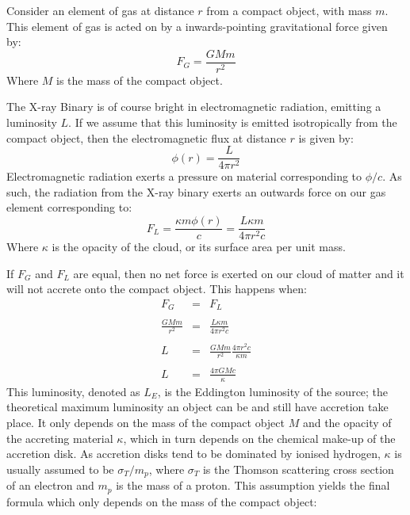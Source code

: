 \par Consider an element of gas at distance $r$ from a compact object, with mass $m$.  This element of gas is acted on by a inwards-pointing gravitational force given by:
\begin{equation}
F_G=\frac{GMm}{r^2}
\end{equation}
Where $M$ is the mass of the compact object.
\par The X-ray Binary is of course bright in electromagnetic radiation, emitting a luminosity $L$.  If we assume that this luminosity is emitted isotropically from the compact object, then the electromagnetic flux at distance $r$ is given by:
\begin{equation}
\phi(r)=\frac{L}{4\pi r^2}
\end{equation}
Electromagnetic radiation exerts a pressure on material corresponding to $\phi/c$.  As such, the radiation from the X-ray binary exerts an outwards force on our gas element corresponding to:
\begin{equation}
F_L=\frac{\kappa m\phi(r)}{c}=\frac{L\kappa m}{4\pi r^2c}
\end{equation}
Where $\kappa$ is the opacity of the cloud, or its surface area per unit mass.
\par If $F_G$ and $F_L$ are equal, then no net force is exerted on our cloud of matter and it will not accrete onto the compact object.  This happens when:
\begin{eqnarray}
F_G&=&F_L\\ \nonumber \\
\frac{GMm}{r^2}&=&\frac{L\kappa m}{4\pi r^2c} \\ \nonumber \\
L&=&\frac{GMm}{r^2}\frac{4\pi r^2c}{\kappa m} \\ \nonumber \\
L&=&\frac{4\pi GMc}{\kappa}
\end{eqnarray}
This luminosity, denoted as $L_E$, is the Eddington luminosity of the source; the theoretical maximum luminosity an object can be and still have accretion take place.  It only depends on the mass of the compact object $M$ and the opacity of the accreting material $\kappa$, which in turn depends on the chemical make-up of the accretion disk.  As accretion disks tend to be dominated by ionised hydrogen, $\kappa$ is usually assumed to be $\sigma_T/m_p$, where $\sigma_T$ is the Thomson scattering cross section of an electron and $m_p$ is the mass of a proton.  This assumption yields the final formula which only depends on the mass of the compact object:
